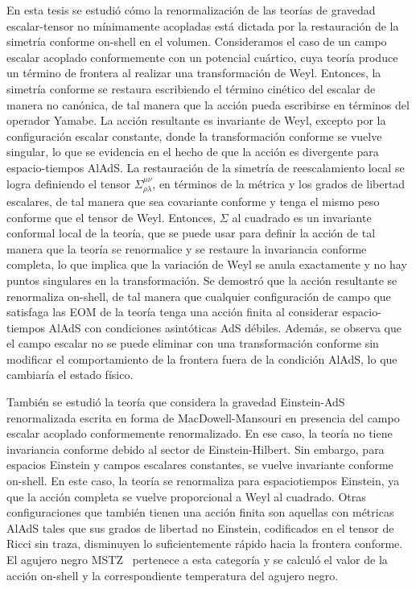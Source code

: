 \documentclass[../Main.tex]{subfiles}
\begin{document}
En esta tesis se estudió cómo la renormalización de las teorías de gravedad escalar-tensor no mínimamente acopladas está dictada por la restauración de la simetría conforme on-shell en el volumen. Consideramos el caso de un campo escalar acoplado conformemente con un potencial cuártico, cuya teoría produce un término de frontera al realizar una transformación de Weyl. Entonces, la simetría conforme se restaura escribiendo el término cinético del escalar de manera no canónica, de tal manera que la acción pueda escribirse en términos del operador Yamabe. La acción resultante es invariante de Weyl, excepto por la configuración escalar constante, donde la transformación conforme se vuelve singular, lo que se evidencia en el hecho de que la acción es divergente para espacio-tiempos AlAdS. La restauración de la simetría de reescalamiento local se logra definiendo el tensor $\Sigma^{\mu \nu}_{\rho \lambda}$, en términos de la métrica y los grados de libertad escalares, de tal manera que sea covariante conforme y tenga el mismo peso conforme que el tensor de Weyl. Entonces, $\Sigma$ al cuadrado es un invariante conformal local de la teoría, que se puede usar para definir la acción de tal manera que la teoría se renormalice y se restaure la invariancia conforme completa, lo que implica que la variación de Weyl se anula exactamente y no hay puntos singulares en la transformación. Se demostró que la acción resultante se renormaliza on-shell, de tal manera que cualquier configuración de campo que satisfaga las EOM de la teoría tenga una acción finita al considerar espacio-tiempos AlAdS con condiciones asintóticas AdS débiles. Además, se observa que el campo escalar no se puede eliminar con una transformación conforme sin modificar el comportamiento de la frontera fuera de la condición AlAdS, lo que cambiaría el estado físico.

También se estudió la teoría que considera la gravedad Einstein-AdS renormalizada escrita en forma de MacDowell-Mansouri en presencia del campo escalar acoplado conformemente renormalizado. En ese caso, la teoría no tiene invariancia conforme debido al sector de Einstein-Hilbert. Sin embargo, para espacios Einstein y campos escalares constantes, se vuelve invariante conforme on-shell. En este caso, la teoría se renormaliza para espaciotiempos Einstein, ya que la acción completa se vuelve proporcional a Weyl al cuadrado. Otras configuraciones que también tienen una acción finita son aquellas con métricas AlAdS tales que sus grados de libertad no Einstein, codificados en el tensor de Ricci sin traza, disminuyen lo suficientemente rápido hacia la frontera conforme. El agujero negro MSTZ~\cite{Martinez:2002ru,Martinez:2005di} pertenece a esta categoría y se calculó el valor de la acción on-shell y la correspondiente temperatura del agujero negro.
\end{document}

